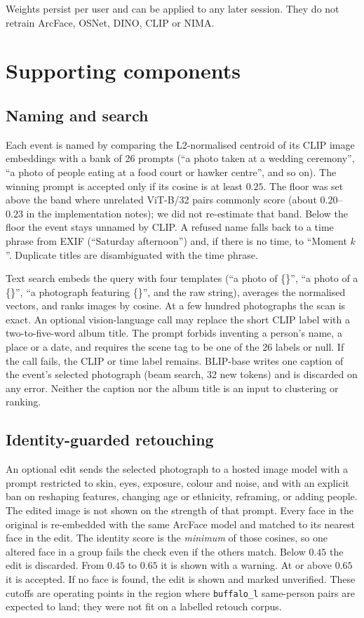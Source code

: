 \documentclass[conference]{IEEEtran}
\begin{document}
Weights persist per user and can be applied to any later session. They do not
retrain ArcFace, OSNet, DINO, CLIP or NIMA.

\section{Supporting components}
\label{sec:support}

\subsection{Naming and search}
\label{sec:clip}

Each event is named by comparing the L2-normalised centroid of its CLIP image
embeddings with a bank of 26 prompts (``a photo taken at a wedding ceremony'',
``a photo of people eating at a food court or hawker centre'', and so on). The
winning prompt is accepted only if its cosine is at least $0.25$. The floor
was set above the band where unrelated ViT-B/32 pairs commonly score
(about $0.20$--$0.23$ in the implementation notes); we did not re-estimate
that band. Below the floor the event stays unnamed by CLIP. A refused name falls
back to a time phrase from EXIF (``Saturday afternoon'') and, if there is no
time, to ``Moment $k$''. Duplicate titles are disambiguated with the time
phrase.

Text search embeds the query with four templates (``a photo of \{\}'', ``a
photo of a \{\}'', ``a photograph featuring \{\}'', and the raw string),
averages the normalised vectors, and ranks images by cosine. At a few hundred
photographs the scan is exact. An optional vision-language call may replace
the short CLIP label with a two-to-five-word album title. The prompt forbids
inventing a person's name, a place or a date, and requires the scene tag to be
one of the 26 labels or null. If the call fails, the CLIP or time label
remains. BLIP-base writes one caption of the event's selected photograph
(beam search, 32 new tokens) and is discarded on any error. Neither the
caption nor the album title is an input to clustering or ranking.

\subsection{Identity-guarded retouching}
\label{sec:enhance}

An optional edit sends the selected photograph to a hosted image model with a
prompt restricted to skin, eyes, exposure, colour and noise, and with an
explicit ban on reshaping features, changing age or ethnicity, reframing, or
adding people. The edited image is not shown on the strength of that prompt.
Every face in the original is re-embedded with the same ArcFace model and
matched to its nearest face in the edit. The identity score is the
\emph{minimum} of those cosines, so one altered face in a group fails the
check even if the others match. Below $0.45$ the edit is discarded. From
$0.45$ to $0.65$ it is shown with a warning. At or above $0.65$ it is accepted.
If no face is found, the edit is shown and marked unverified. These cutoffs are
operating points in the region where \texttt{buffalo\_l} same-person pairs are
expected to land; they were not fit on a labelled retouch corpus.
\end{document}
